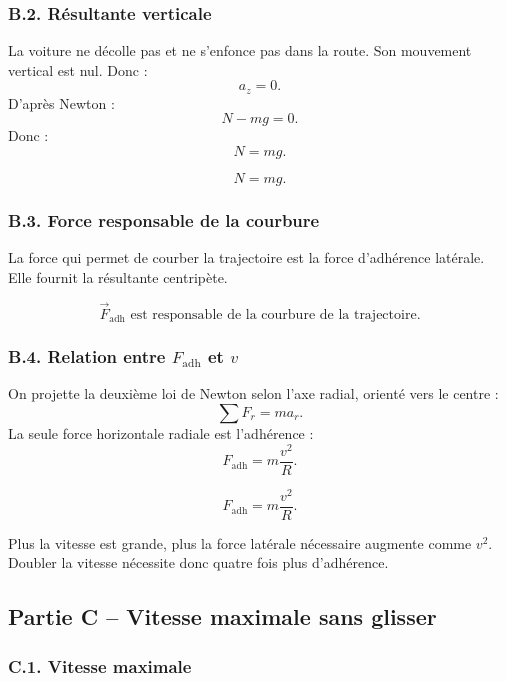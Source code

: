 \documentclass[11pt,a4paper]{article}
\begin{document}
\subsubsection*{B.2. Résultante verticale}

La voiture ne décolle pas et ne s'enfonce pas dans la route. Son mouvement vertical est nul.
Donc :
\[
a_z=0.
\]
D'après Newton :
\[
N-mg=0.
\]
Donc :
\[
N=mg.
\]

\begin{resultatbox}
\[
\boxed{N=mg.}
\]
\end{resultatbox}

\subsubsection*{B.3. Force responsable de la courbure}

La force qui permet de courber la trajectoire est la force d'adhérence latérale.
Elle fournit la résultante centripète.

\begin{resultatbox}
\[
\boxed{\vec F_{\text{adh}} \text{ est responsable de la courbure de la trajectoire.}}
\]
\end{resultatbox}

\subsubsection*{B.4. Relation entre $F_{\text{adh}}$ et $v$}

On projette la deuxième loi de Newton selon l'axe radial, orienté vers le centre :
\[
\sum F_r=ma_r.
\]
La seule force horizontale radiale est l'adhérence :
\[
F_{\text{adh}}=m\frac{v^2}{R}.
\]

\begin{resultatbox}
\[
\boxed{F_{\text{adh}}=m\frac{v^2}{R}.}
\]
\end{resultatbox}

\begin{remarquebox}
Plus la vitesse est grande, plus la force latérale nécessaire augmente comme $v^2$.
Doubler la vitesse nécessite donc quatre fois plus d'adhérence.
\end{remarquebox}

\subsection{Partie C -- Vitesse maximale sans glisser}

\subsubsection*{C.1. Vitesse maximale}
\end{document}
